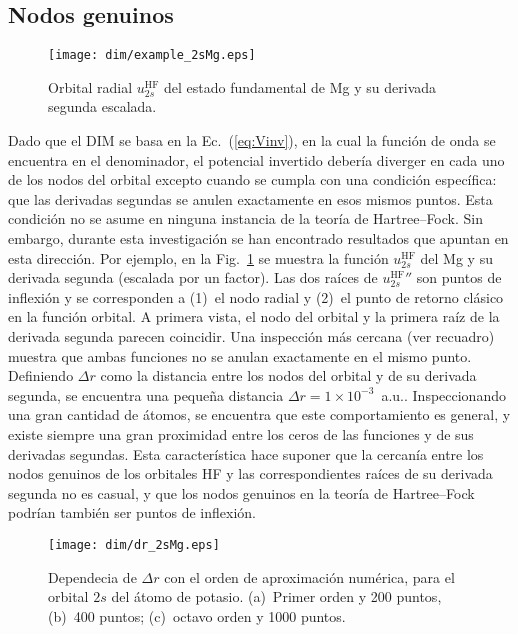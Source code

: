 \subsection{Nodos genuinos}
\label{subsec:nodosHF}

\begin{figure}[t]
\centering
\texttt{[image: dim/example\_2sMg.eps]} 
\caption[Orbital radial y su derivada segunda.]
{Orbital radial $u_{2s}^{\mathrm{HF}}$ del estado fundamental de Mg y su 
derivada segunda escalada.}
\label{fig:example2sMg}
\end{figure}

Dado que el DIM se basa en la Ec.~(\ref{eq:Vinv}), en la cual la función 
de onda se encuentra en el denominador, el potencial invertido debería 
diverger en cada uno de los nodos del orbital excepto cuando se cumpla 
con una condición específica: que las derivadas segundas se anulen 
exactamente en esos mismos puntos. Esta condición no se asume en ninguna 
instancia de la teoría de Hartree--Fock. Sin embargo, durante esta 
investigación se han encontrado resultados que apuntan en esta 
dirección. Por ejemplo, en la Fig.~\ref{fig:example2sMg} se muestra la 
función $u_{2s}^{\mathrm{HF}}$ del Mg y su derivada segunda (escalada 
por un factor). Las dos raíces de $u_{2s}^{\mathrm{HF}}''$ son puntos de 
inflexión y se corresponden a (1)~el nodo radial y (2)~el punto de 
retorno clásico en la función orbital. A primera vista, el nodo del 
orbital y la primera raíz de la derivada segunda parecen coincidir. Una 
inspección más cercana (ver recuadro) muestra que ambas funciones no se 
anulan exactamente en el mismo punto. Definiendo $\Delta r$ como la 
distancia entre los nodos del orbital y de su derivada segunda, se 
encuentra una pequeña distancia $\Delta r=1\times 10^{-3}$~a.u.. 
Inspeccionando una gran cantidad de átomos, se encuentra que este 
comportamiento es general, y existe siempre una gran proximidad entre 
los ceros de las funciones y de sus derivadas segundas. Esta 
característica hace suponer que la cercanía entre los nodos genuinos de 
los orbitales HF y las correspondientes raíces de su derivada segunda 
no es casual, y que los nodos genuinos en la teoría de Hartree--Fock 
podrían también ser puntos de inflexión. 

\begin{figure}[t]
\centering
\texttt{[image: dim/dr\_2sMg.eps]} 
\caption{Dependecia de $\Delta r$ con el orden de aproximación numérica, 
para el orbital $2s$ del átomo de potasio. (a)~Primer orden y 200 
puntos, (b)~400 puntos; (c)~octavo orden y 1000 puntos.}
\label{fig:dr2sMg}
\end{figure}

